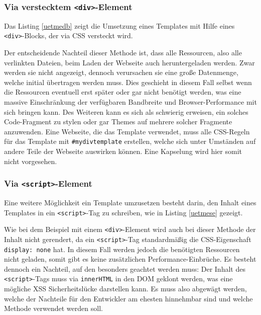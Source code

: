 \subsubsection{Via verstecktem \texttt{\textless{}div\textgreater{}}-Element}

Das Listing \ref{uetmedb} zeigt die Umsetzung eines Templates mit Hilfe eines \texttt{\textless{}div\textgreater{}}-Blocks, der via \ac{CSS} versteckt wird.



Der entscheidende Nachteil dieser Methode ist, dass alle Ressourcen, also alle verlinkten Dateien, beim Laden der Webseite auch heruntergeladen werden. Zwar werden sie nicht angezeigt, dennoch verursachen sie eine große Datenmenge, welche initial übertragen werden muss. Dies geschieht in diesem Fall selbst wenn die Ressourcen eventuell erst später oder gar nicht benötigt werden, was eine massive Einschränkung der verfügbaren Bandbreite und Browser-Performance mit sich bringen kann. Des Weiteren kann es sich als schwierig erweisen, ein solches Code-Fragment zu stylen oder gar Themes auf mehrere solcher Fragmente anzuwenden. Eine Webseite, die das Template verwendet, muss alle \ac{CSS}-Regeln für das Template mit \texttt{\#mydivtemplate} erstellen, welche sich unter Umständen auf andere Teile der Webseite auswirken können. Eine Kapselung wird hier somit nicht vorgesehen.

\subsubsection{Via \texttt{\textless{}script\textgreater{}}-Element}

Eine weitere Möglichkeit ein Template umzusetzen besteht darin, den Inhalt eines Templates in ein \texttt{\textless{}script\textgreater{}}-Tag zu schreiben, wie in Listing \ref{uetmese} gezeigt.



Wie bei dem Beispiel mit einem \texttt{\textless{}div\textgreater{}}-Element wird auch bei dieser Methode der Inhalt nicht gerendert, da ein \texttt{\textless{}script\textgreater{}}-Tag standardmäßig die \ac{CSS}-Eigenschaft \texttt{display:\ none} hat. In diesem Fall werden jedoch die benötigten Ressourcen nicht geladen, somit gibt es keine zusätzlichen Performance-Einbrüche. Es besteht dennoch ein Nachteil, auf den besonders geachtet werden muss: Der Inhalt des \texttt{\textless{}script\textgreater{}}-Tags muss via \texttt{innerHTML} in den \ac{DOM} geklont werden, was eine mögliche \ac{XSS} Sicherheitslücke darstellen kann. Es muss also abgewägt werden, welche der Nachteile für den Entwickler am ehesten hinnehmbar sind und welche Methode verwendet werden soll.


